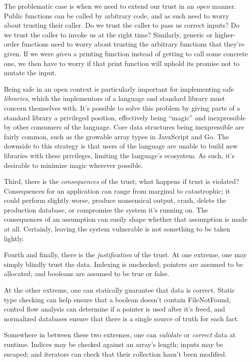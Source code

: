 The problematic case is when we need to extend our trust in an \emph{open} manner. Public
functions can be called by arbitrary code, and as such need to worry about trusting
their caller. Do we trust the caller to pass us correct inputs? Do we trust the caller
to invoke us at the right time? Similarly, generic or higher-order functions need to
worry about trusting the arbitrary functions that they're given. If we were \emph{given}
a printing function instead of getting to call some concrete
one, we then have to worry if that print function will uphold its promise not to mutate
the input.

Being safe in an open context is particularly important for implementing safe
\emph{libraries}, which the implementors of a language and standard
library must concern themselves with. It's possible to solve this problem by
giving parts of a standard library a privileged position, effectively being
``magic'' and inexpressible by other consumers of the language.
Core data structures being inexpressible are fairly common, such as the
growable array types in JavaScript and Go.
The downside to this strategy is that users of the language are unable to build
new libraries with these privileges, limiting the language's ecosystem. As such,
it's desirable to minimize magic wherever possible.




Third, there is the \emph{consequences} of the trust; what happens if trust
is violated? Consequences for an application can range from marginal to catastrophic;
it could perform slightly worse, produce nonsensical output, crash, delete the
production database, or compromise the system it's running on.
The consequences of an assumption can easily shape whether that assumption is
made at all. Certainly, leaving the system vulnerable is not something to be
taken lightly.




Fourth and finally, there is the \emph{justification} of the trust. At one extreme, one may simply
blindly trust the data. Indexing is unchecked; pointers are assumed to be
allocated; and booleans are assumed to be true or false.

At the other extreme, one can statically guarantee that data is correct. Static
type checking can help ensure that a boolean doesn't contain FileNotFound,
control flow analysis can determine if a pointer is used after it's freed, and
normalized databases ensure that there is a single source of truth for each fact.

Somewhere in between these two extremes, one can \emph{validate} or \emph{correct} data
at runtime. Indices may be checked against an array's length; inputs may
be escaped; and iterators can check that their collection hasn't been modified.

